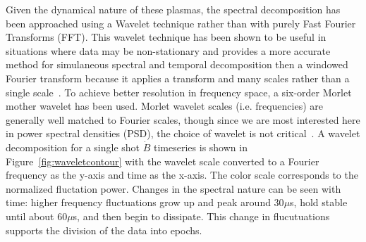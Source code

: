 \documentclass[12pt]{iopart}
\begin{document}
Given the dynamical nature of these plasmas, the spectral decomposition has been approached using a Wavelet technique rather than with purely Fast Fourier Transforms (FFT). This wavelet technique has been shown to be useful in situations where data may be non-stationary and provides a more accurate method for simulaneous spectral and temporal decomposition then a windowed Fourier transform because it applies a transform and many scales rather than a single scale~\cite{torrence98}. To achieve better resolution in frequency space, a six-order Morlet mother wavelet has been used. Morlet wavelet scales (i.e. frequencies) are generally well matched to Fourier scales, though since we are most interested here in power spectral densities (PSD), the choice of wavelet is not critical~\cite{torrence98}. A wavelet decomposition for a single shot $\dot{B}$ timeseries is shown in Figure~\ref{fig:waveletcontour} with the wavelet scale converted to a Fourier frequency as the y-axis and time as the x-axis. The color scale corresponds to the normalized fluctation power. Changes in the spectral nature can be seen with time: higher frequency fluctuations grow up and peak around 30$\mu$s, hold stable until about 60$\mu$s, and then begin to dissipate. This change in flucutuations supports the division of the data into epochs.
\end{document}
